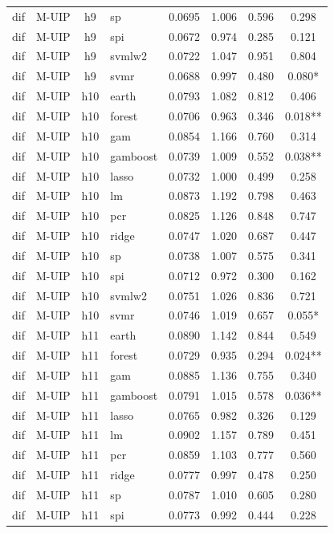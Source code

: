 \begin{ThreePartTable}
\begin{longtable}[t]{llclcccc}
dif & M-UIP & h9 & sp & 0.0695 & 1.006 & 0.596 & 0.298\\
dif & M-UIP & h9 & spi & 0.0672 & 0.974 & 0.285 & 0.121\\
dif & M-UIP & h9 & svmlw2 & 0.0722 & 1.047 & 0.951 & 0.804\\
dif & M-UIP & h9 & svmr & 0.0688 & 0.997 & 0.480 & 0.080*\\
\addlinespace
dif & M-UIP & h10 & earth & 0.0793 & 1.082 & 0.812 & 0.406\\
dif & M-UIP & h10 & forest & 0.0706 & 0.963 & 0.346 & 0.018**\\
dif & M-UIP & h10 & gam & 0.0854 & 1.166 & 0.760 & 0.314\\
dif & M-UIP & h10 & gamboost & 0.0739 & 1.009 & 0.552 & 0.038**\\
dif & M-UIP & h10 & lasso & 0.0732 & 1.000 & 0.499 & 0.258\\
dif & M-UIP & h10 & lm & 0.0873 & 1.192 & 0.798 & 0.463\\
dif & M-UIP & h10 & pcr & 0.0825 & 1.126 & 0.848 & 0.747\\
dif & M-UIP & h10 & ridge & 0.0747 & 1.020 & 0.687 & 0.447\\
dif & M-UIP & h10 & sp & 0.0738 & 1.007 & 0.575 & 0.341\\
dif & M-UIP & h10 & spi & 0.0712 & 0.972 & 0.300 & 0.162\\
dif & M-UIP & h10 & svmlw2 & 0.0751 & 1.026 & 0.836 & 0.721\\
dif & M-UIP & h10 & svmr & 0.0746 & 1.019 & 0.657 & 0.055*\\
\addlinespace
dif & M-UIP & h11 & earth & 0.0890 & 1.142 & 0.844 & 0.549\\
dif & M-UIP & h11 & forest & 0.0729 & 0.935 & 0.294 & 0.024**\\
dif & M-UIP & h11 & gam & 0.0885 & 1.136 & 0.755 & 0.340\\
dif & M-UIP & h11 & gamboost & 0.0791 & 1.015 & 0.578 & 0.036**\\
dif & M-UIP & h11 & lasso & 0.0765 & 0.982 & 0.326 & 0.129\\
dif & M-UIP & h11 & lm & 0.0902 & 1.157 & 0.789 & 0.451\\
dif & M-UIP & h11 & pcr & 0.0859 & 1.103 & 0.777 & 0.560\\
dif & M-UIP & h11 & ridge & 0.0777 & 0.997 & 0.478 & 0.250\\
dif & M-UIP & h11 & sp & 0.0787 & 1.010 & 0.605 & 0.280\\
dif & M-UIP & h11 & spi & 0.0773 & 0.992 & 0.444 & 0.228\\

\end{longtable}
\end{ThreePartTable}
